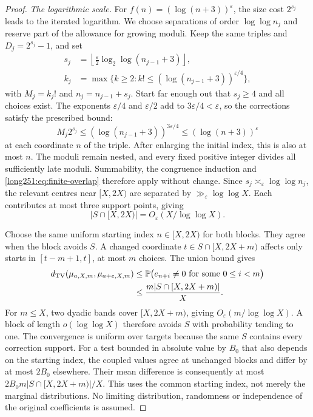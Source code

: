 \begin{proof}
\par\medskip\noindent\emph{The logarithmic scale.}
For $f(n)=(\log(n+3))^\varepsilon$, the size cost $2^{s_j}$ leads to
the iterated logarithm.  We choose separations of order $\log\log n_j$
and reserve part of the allowance for growing moduli.  Keep the same
triples and $D_j=2^{s_j}-1$, and set
\begin{equation}\label{long251:eq:sparse-polylog-schedule}
 \begin{aligned}
 s_j&=\left\lfloor\frac{\varepsilon}{2}
               \log_2\log(n_{j-1}+3)\right\rfloor,\\
 k_j&=\max\{k\ge2:k!\le(\log(n_{j-1}+3))^{\varepsilon/4}\},
 \end{aligned}
\end{equation}
with $M_j=k_j!$ and $n_j=n_{j-1}+s_j$.  Start far enough out that
$s_j\ge4$ and all choices exist.  The exponents $\varepsilon/4$ and
$\varepsilon/2$ add to $3\varepsilon/4<\varepsilon$, so the corrections
satisfy the prescribed bound:
\[
 M_j2^{s_j}\le(\log(n_{j-1}+3))^{3\varepsilon/4}
             \le(\log(n+3))^\varepsilon
\]
at each coordinate $n$ of the triple.  After enlarging the initial
index, this is also at most $n$.  The moduli remain nested, and every fixed positive integer divides all
sufficiently late moduli.  Summability, the congruence induction and
\eqref{long251:eq:finite-overlap} therefore apply without change.  Since
$s_j\asymp_\varepsilon\log\log n_j$, the relevant centres near $[X,2X)$
are separated by $\gg_\varepsilon\log\log X$.  Each contributes at most
three support points, giving
\[
 |S\cap[X,2X)|=O_\varepsilon(X/\log\log X).
\]

Choose the same uniform starting index $n\in[X,2X)$ for both
blocks.  They agree when the block avoids $S$.  A changed coordinate
$t\in S\cap[X,2X+m)$ affects only starts in $[t-m+1,t]$, at most
$m$ choices.  The union bound gives
\[
 \begin{aligned}
 d_{\rm TV}(\mu_{a,X,m},\mu_{a+e,X,m})
 &\le\mathbb P\bigl(e_{n+i}\ne0\text{ for some }0\le i<m\bigr)\\
 &\le\frac{m|S\cap[X,2X+m)|}{X}.
 \end{aligned}
\]
For $m\le X$, two dyadic bands cover $[X,2X+m)$, giving
$O_\varepsilon(m/\log\log X)$.  A block of length $o(\log\log X)$
therefore avoids $S$ with probability tending to one.  The convergence
is uniform over targets because the same $S$ contains every correction
support.
For a test bounded in absolute value by $B_0$ that also depends on the
starting index, the coupled values agree at unchanged blocks and differ
by at most $2B_0$ elsewhere.  Their mean difference is consequently at
most $2B_0m|S\cap[X,2X+m)|/X$.  This uses the common starting index,
not merely the marginal distributions.  No limiting distribution,
randomness or independence of the original coefficients is assumed.
\end{proof}
